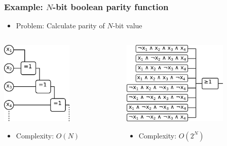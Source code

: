 \begin{frame}
	\frametitle{Example: $N$-bit boolean parity function}
	\begin{itemize}
		\item Problem: Calculate parity of $N$-bit value
	\end{itemize}
	\begin{columns}
		\begin{column}{5cm}
			\includegraphics[height=4cm]{images/daisyChainXOR.png}
			\begin{itemize}
				\item Complexity: $O(N)$
			\end{itemize}
		\end{column}
		\begin{column}{5cm}
			\includegraphics[height=4cm]{images/parityDNF.png}
			\begin{itemize}
				\item Complexity: $O(2^N)$
			\end{itemize}
		\end{column}
	\end{columns}
\end{frame}
